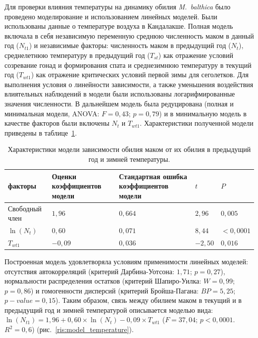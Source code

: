 Для проверки влияния температуры на динамику обилия \textit{M.~balthica} было проведено моделирование и использованием линейных моделей. 
Были использованы данные о температуре воздуха в Кандалакше. 
Полная модель включала в себя независимую переменную среднюю численность маком в данный год ($N_{t1}$) и независимые факторы: численность маком в предыдущий год ($N_{t}$), среднелетнюю температуру в предыдущий год ($T_{st}$) как отражение условий созревание гонад и формирования спата и среднезимнюю температуру в текущий год ($T_{wt1}$) как отражение критических условий первой зимы для сеголетков. 
Для выполнения условия о линейности зависимости, а также уменьшения воздействия влиятельных наблюдений в модели были использованы логарифмированные значения численности. 
В дальнейшем модель была редуцирована (полная и минимальная модели, ANOVA: $F = 0,43$; $p = 0,79$) и в минимальную модель в качестве факторов были включены $N_{t}$ и $T_{wt1}$. 
Характеристики полученной модели приведены в таблице~\ref{tab:model_koeff}. 
	\begin{table}[p]
	\caption{Характеристики модели зависимости обилия маком от их обилия в предыдущий год и зимней температуры.}
	\label{tab:model_koeff}
		\begin{tabularx}{\textwidth}{|X|X|X|X|X|}
			\hline
			факторы & Оценки  коэффициентов модели & Стандартная ошибка коэффициентов модели & $t$ & $P$ \\ \hline
			Свободный член & $1,96$ & $0,664$ & $2,96$ & $0,005$ \\ \hline
			$\ln(N_{t})$ & $0,60$ & $0,071$ & $8,44$ & $<0,0001$ \\ \hline
			$T_{wt1}$ & $-0,09$ & $0,036$ & $-2,50$ & $0,016$ \\ \hline
		\end{tabularx}
	\end{table}
Построенная модель удовлетворяла условиям применимости линейных моделей: отсутствия автокорреляций (критерий Дарбина-Уотсона: $1,71$; $p = 0,27$), нормальности распределения остатков (критерий Шапиро-Уилка: $W = 0,99$; $p = 0,86$) и гомогенности дисперсий (критерий Бройша-Пагана: $BP = 5,25$; $p-value = 0,15$). 
Таким образом, связь между обилием маком в текущий и в предыдущий год и зимней температурой описывается моделью вида: $\ln(N_{t1}) = 1,96 + 0,60 \times \ln(N_{t}) - 0,09 \times T_{wt1}$ ($F = 37,04$; $p < 0,0001$. $R^2 = 0,6$) (рис.~\ref{ris:model_temperature}).
